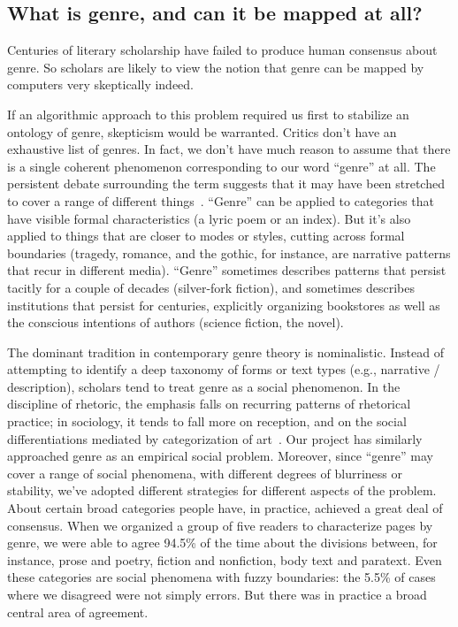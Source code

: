 \documentclass[paper=a4, fontsize=12pt]{scrartcl}
\numberwithin{equation}{section}		%
\numberwithin{figure}{section}			%
\numberwithin{table}{section}				%
\begin{document}
\subsection{What is genre, and can it be mapped at all?}
Centuries of literary scholarship have failed to produce human consensus about genre. So scholars are likely to view the notion that genre can be mapped by computers very skeptically indeed.

If an algorithmic approach to this problem required us first to stabilize an ontology of genre, skepticism would be warranted. Critics don't have an exhaustive list of genres. In fact, we don't have much reason to assume that there is a single coherent phenomenon corresponding to our word ``genre'' at all. The persistent debate surrounding the term suggests that it may have been stretched to cover a range of different things~\cite{santini:genre}. ``Genre'' can be applied to categories that have visible formal characteristics (a lyric poem or an index). But it's also applied to things that are closer to modes or styles, cutting across formal boundaries (tragedy, romance, and the gothic, for instance, are narrative patterns that recur in different media). ``Genre'' sometimes describes patterns that persist tacitly for a couple of decades (silver-fork fiction), and sometimes describes institutions that persist for centuries, explicitly organizing bookstores as well as the conscious intentions of authors (science fiction, the novel).

The dominant tradition in contemporary genre theory is nominalistic. Instead of attempting to identify a deep taxonomy of forms or text types (e.g., narrative / description), scholars tend to treat genre as a social phenomenon. In the discipline of rhetoric, the emphasis falls on recurring patterns of rhetorical practice; in sociology, it tends to fall more on reception, and on the social differentiations mediated by categorization of art~\cite{devitt:genre, dimaggio:classification}. Our project has similarly approached genre as an empirical social problem. Moreover, since ``genre'' may cover a range of social phenomena, with different degrees of blurriness or stability, we've adopted different strategies for different aspects of the problem. About certain broad categories people have, in practice, achieved a great deal of consensus. When we organized a group of five readers to characterize pages by genre, we were able to agree 94.5\% of the time about the divisions between, for instance, prose and poetry, fiction and nonfiction, body text and paratext. Even these categories are social phenomena with fuzzy boundaries: the 5.5\% of cases where we disagreed were not simply errors. But there was in practice a broad central area of agreement.
\end{document}
